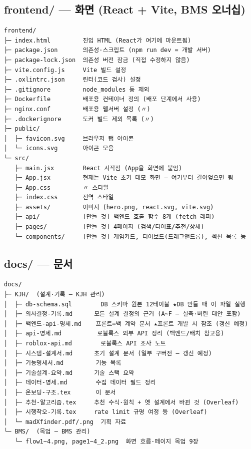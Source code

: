 \documentclass[11pt]{article}
\begin{document}
\subsection{frontend/ --- 화면 (React + Vite, BMS 오너십)}
\begin{Verbatim}[frame=single, fontsize=\small]
frontend/
├─ index.html         진입 HTML (React가 여기에 마운트됨)
├─ package.json       의존성·스크립트 (npm run dev = 개발 서버)
├─ package-lock.json  의존성 버전 잠금 (직접 수정하지 않음)
├─ vite.config.js     Vite 빌드 설정
├─ .oxlintrc.json     린터(코드 검사) 설정
├─ .gitignore         node_modules 등 제외
├─ Dockerfile         배포용 컨테이너 정의 (배포 단계에서 사용)
├─ nginx.conf         배포용 웹서버 설정 (〃)
├─ .dockerignore      도커 빌드 제외 목록 (〃)
├─ public/
│  ├─ favicon.svg     브라우저 탭 아이콘
│  └─ icons.svg       아이콘 모음
└─ src/
   ├─ main.jsx        React 시작점 (App을 화면에 붙임)
   ├─ App.jsx         현재는 Vite 초기 데모 화면 — 여기부터 갈아엎으면 됨
   ├─ App.css         〃 스타일
   ├─ index.css       전역 스타일
   ├─ assets/         이미지 (hero.png, react.svg, vite.svg)
   ├─ api/            [만들 것] 백엔드 호출 함수 8개 (fetch 래퍼)
   ├─ pages/          [만들 것] 4페이지 (검색/티어표/추천/상세)
   └─ components/     [만들 것] 게임카드, 티어보드(드래그앤드롭), 섹션 목록 등
\end{Verbatim}

\subsection{docs/ --- 문서}
\begin{Verbatim}[frame=single, fontsize=\small]
docs/
├─ KJH/  (설계·기록 — KJH 관리)
│  ├─ db-schema.sql        DB 스키마 원본 12테이블 ★DB 만들 때 이 파일 실행
│  ├─ 의사결정-기록.md      모든 설계 결정의 근거 (A~F — 실측·버린 대안 포함)
│  ├─ 백엔드-api-명세.md    프론트↔백 계약 문서 ★프론트 개발 시 참조 (갱신 예정)
│  ├─ api-명세.md          로블록스 외부 API 정리 (백엔드/배치 참고용)
│  ├─ roblox-api.md        로블록스 API 조사 노트
│  ├─ 시스템-설계서.md      초기 설계 문서 (일부 구버전 — 갱신 예정)
│  ├─ 기능명세서.md         기능 목록
│  ├─ 기술설계-요약.md      기술 스택 요약
│  ├─ 데이터-명세.md        수집 데이터 필드 정리
│  ├─ 온보딩-구조.tex       이 문서
│  ├─ 추천-알고리즘.tex     추천 수식·원칙 + 옛 설계에서 바뀐 것 (Overleaf)
│  ├─ 시행착오-기록.tex     rate limit 규명 여정 등 (Overleaf)
│  └─ madXfinder.pdf/.png  기획 자료
└─ BMS/  (목업 — BMS 관리)
   └─ flow1~4.png, page1~4_2.png  화면 흐름·페이지 목업 9장
\end{Verbatim}
\end{document}
